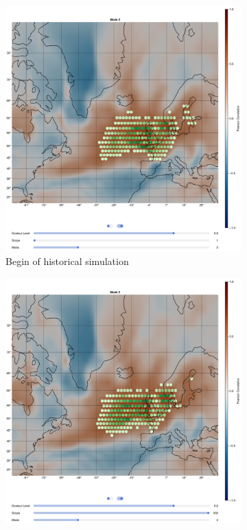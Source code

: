 \begin{figure}[!htb]
  \begin{subfigure}[b]{0.32\textwidth}
    \includegraphics[width=\textwidth]{figures/ivt_pr_cor_mode2_historical_hexbin.png}
    \caption{Begin of historical simulation}
    \label{fig:ivt eof pr cor historical mode2}
  \end{subfigure}
  \hfill
  \begin{subfigure}[b]{0.32\textwidth}
    \includegraphics[width=\textwidth]{figures/ivt_pr_cor_mode2_ssp126_hexbin.png}

\end{subfigure}
\end{figure}
